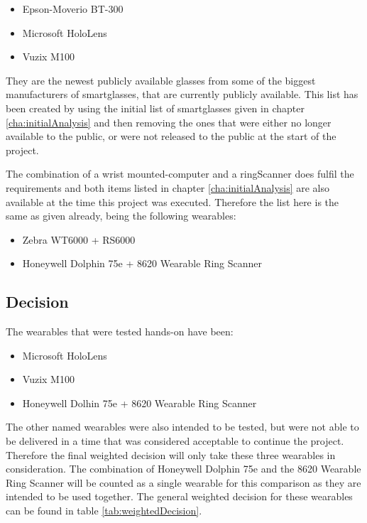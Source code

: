 \begin{itemize}
	\item Epson-Moverio BT-300
	\item Microsoft HoloLens
	\item Vuzix M100
\end{itemize}

They are the newest publicly available glasses from some of the biggest manufacturers of \gls{smartglasses}, that are currently publicly available. This list has been created by using the initial list of smartglasses given in chapter \ref{cha:initialAnalysis} and then removing the ones that were either no longer available to the public, or were not released to the public at the start of the project.

The combination of a wrist mounted-computer and a \gls{ringScanner} does fulfil the requirements and both items listed in chapter \ref{cha:initialAnalysis} are also available at the time this project was executed. Therefore the list here is the same as given already, being the following wearables:

\begin{itemize}
	\item Zebra WT6000 + RS6000
	\item Honeywell Dolphin 75e + 8620 Wearable Ring Scanner
\end{itemize}

\subsection{Decision}

The wearables that were tested hands-on have been:
\begin{itemize}
	\item Microsoft HoloLens
	\item Vuzix M100
	\item Honeywell Dolhin 75e + 8620 Wearable Ring Scanner
\end{itemize}

The other named wearables were also intended to be tested, but were not able to be delivered in a time that was considered acceptable to continue the project. Therefore the final weighted decision will only take these three wearables in consideration. The combination of Honeywell Dolphin 75e and the 8620 Wearable Ring Scanner will be counted as a single wearable for this comparison as they are intended to be used together. The general weighted decision for these wearables can be found in table \ref{tab:weightedDecision}. 

